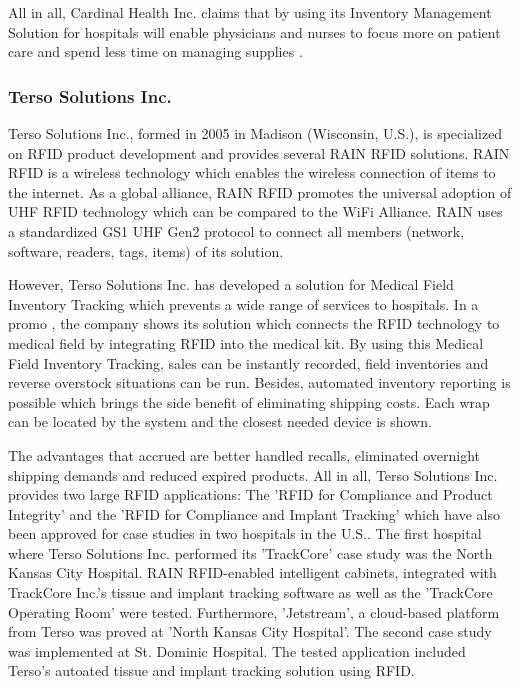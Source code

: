 All in all, Cardinal Health Inc. claims that by using its Inventory Management Solution for hospitals will enable physicians and nurses to focus more on patient care and spend less time on managing supplies  \cite{cardinal_video}.

\subsubsection{Terso Solutions Inc.}

Terso Solutions Inc., formed in 2005 in Madison (Wisconsin, U.S.), is specialized on RFID product development and provides several \ac{RAIN} RFID solutions. RAIN RFID \cite{rainrfid} is a wireless technology which enables the wireless connection of items to the internet. As a global alliance, RAIN RFID promotes the universal adoption of \ac{UHF} RFID technology which can be compared to the WiFi Alliance. RAIN uses a standardized GS1 UHF Gen2 protocol to connect all members (network, software, readers, tags, items) of its solution.

However, Terso Solutions Inc. has developed a solution for Medical Field Inventory Tracking which prevents a wide range of services to hospitals. In a promo \cite{terso_video}, the company shows its solution which connects the RFID technology to medical field by integrating RFID into the medical kit. By using this Medical Field Inventory Tracking, sales can be instantly recorded, field inventories and reverse overstock situations can be run. Besides, automated inventory reporting is possible which brings the side benefit of eliminating shipping costs. Each wrap can be located by the system and the closest needed device is shown.

The advantages that accrued are better handled recalls, eliminated overnight shipping demands and reduced expired products. All in all, Terso Solutions Inc. provides two large RFID applications: The 'RFID for Compliance and Product Integrity' and the 'RFID for Compliance and Implant Tracking' which have also been approved for case studies in two hospitals in the U.S.. The first hospital where Terso Solutions Inc. performed its 'TrackCore' case study was the North Kansas City Hospital. RAIN RFID-enabled intelligent cabinets, integrated with TrackCore Inc.'s tissue and implant tracking software as well as the 'TrackCore Operating Room' were tested. Furthermore, 'Jetstream', a cloud-based platform from Terso was proved at 'North Kansas City Hospital'. The second case study was implemented at St. Dominic Hospital. The tested application included Terso's autoated tissue and implant tracking solution using RFID.


